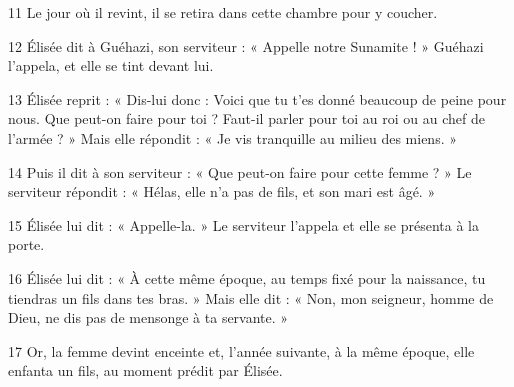 
11 Le jour où il revint, il se retira dans cette chambre pour y coucher.

12 Élisée dit à Guéhazi, son serviteur : « Appelle notre Sunamite ! » Guéhazi l’appela, et elle se tint devant lui.

13 Élisée reprit : « Dis-lui donc : Voici que tu t’es donné beaucoup de peine pour nous. Que peut-on faire pour toi ? Faut-il parler pour toi au roi ou au chef de l’armée ? » Mais elle répondit : « Je vis tranquille au milieu des miens. »

14 Puis il dit à son serviteur : « Que peut-on faire pour cette femme ? » Le serviteur répondit : « Hélas, elle n’a pas de fils, et son mari est âgé. »

15 Élisée lui dit : « Appelle-la. » Le serviteur l’appela et elle se présenta à la porte.

16 Élisée lui dit : « À cette même époque, au temps fixé pour la naissance, tu tiendras un fils dans tes bras. » Mais elle dit : « Non, mon seigneur, homme de Dieu, ne dis pas de mensonge à ta servante. »

17 Or, la femme devint enceinte et, l’année suivante, à la même époque, elle enfanta un fils, au moment prédit par Élisée.